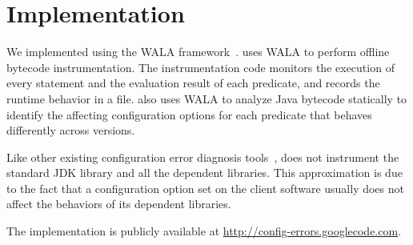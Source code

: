 \section{Implementation}
\label{sec:implementation}

We implemented \ourtool using the WALA
framework~\cite{wala}. \ourtool uses WALA to perform offline
bytecode instrumentation. The instrumentation code
monitors the execution of every statement and the evaluation
result of each predicate, and records the runtime behavior
in a file. \ourtool also uses WALA
to analyze Java bytecode statically to
identify the affecting configuration options
for each predicate that behaves differently across versions.

Like other existing configuration error
diagnosis tools~\cite{Rabkin:2011:PPC, Zhang:2013:ADS}, \ourtool
does not instrument the standard JDK library and
all the dependent libraries. This approximation
is due to the fact that a configuration
option set on the client software usually
does not affect the behaviors of its dependent libraries.

The \ourtool implementation is publicly available at
\url{http://config-errors.googlecode.com}.
